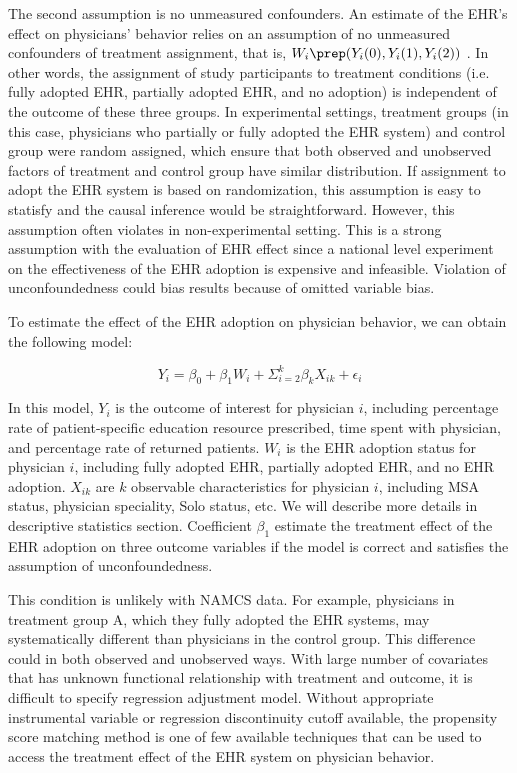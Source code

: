 The second assumption is no unmeasured confounders. An estimate of the EHR's effect on physicians' behavior relies on an assumption of no unmeasured confounders of treatment assignment, that is, $W_i \prep (Y_i(0),Y_i(1),Y_i(2))$ \citep{imbens2008recent}. In other words, the assignment of study participants to treatment conditions (i.e. fully adopted EHR, partially adopted EHR, and no adoption) is independent of the outcome of these three groups. In experimental settings, treatment groups (in this case, physicians who partially or fully adopted the EHR system) and control group were random assigned, which ensure that both observed and unobserved factors of treatment and control group have similar distribution. If assignment to adopt the EHR system is based on randomization, this assumption is easy to statisfy and the causal inference would be straightforward. However, this assumption often violates in non-experimental setting. This is a strong assumption with the evaluation of EHR effect since a national level experiment on the effectiveness of the EHR adoption is expensive and infeasible. Violation of unconfoundedness could bias results because of omitted variable bias.

To estimate the effect of the EHR adoption on physician behavior, we can obtain the following model:

\begin{equation*}
Y_{i} = \beta_0 + \beta_1 W_i + \Sigma^k_{i=2} \beta_k X_{ik} + \epsilon_{i}
\end{equation*}

In this model, $Y_{i}$ is the outcome of interest for physician $i$, including percentage rate of patient-specific education resource prescribed, time spent with physician, and percentage rate of returned patients. $W_i$ is the EHR adoption status for physician $i$, including fully adopted EHR, partially adopted EHR, and no EHR adoption. $X_{ik}$ are $k$ observable characteristics for physician $i$, including MSA status, physician speciality, Solo status, etc. We will describe more details in descriptive statistics section. Coefficient $\beta_1$ estimate the treatment effect of the EHR adoption on three outcome variables if the model is correct and satisfies the assumption of unconfoundedness. 

This condition is unlikely with NAMCS data. For example, physicians in treatment group A, which they fully adopted the EHR systems, may systematically different than physicians in the control group. This difference could in both observed and unobserved ways. With large number of covariates that has unknown functional relationship with treatment and outcome, it is difficult to specify regression adjustment model. Without appropriate instrumental variable or regression discontinuity cutoff available, the propensity score matching method is one of few available techniques that can be used to access the treatment effect of the EHR system on physician behavior.

